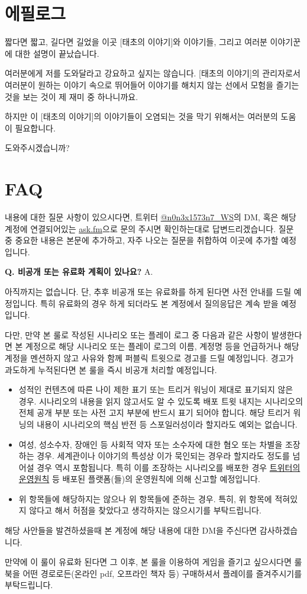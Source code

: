 \documentclass[12pt]{report}
\newcounter{qnactr}
\newenvironment{faq}[1]
{
		\refstepcounter{qnactr}
		\par\medskip
		\textbf{\large Q\theqnactr. #1}
		\newline\rmfamily
		A\theqnactr.
}
{\par\medskip}
\newcommand{\world}[1]{{\nanumpen \large #1 \par}\bigskip}
\begin{document}
	\chapter{에필로그}
	\world{짧다면 짧고, 길다면 길었을 이곳 [태초의 이야기]와 이야기들, 그리고 여러분 이야기꾼에 대한 설명이 끝났습니다.}
	\world{여러분에게 저를 도와달라고 강요하고 싶지는 않습니다. [태초의 이야기]의 관리자로서 여러분이 원하는 이야기 속으로 뛰어들어 이야기를 해치지 않는 선에서 모험을 즐기는 것을 보는 것이 제 재미 중 하나니까요.}
	\world{하지만 이 [태초의 이야기]의 이야기들이 오염되는 것을 막기 위해서는 여러분의 도움이 필요합니다.}
	\world{도와주시겠습니까?}
	
	\chapter{FAQ}
	내용에 대한 질문 사항이 있으시다면, 트위터 \href{https://www.twitter.com/n0n3x1573n7_WS}{@n0n3x1573n7\_WS}의 DM, 혹은 해당 계정에 연결되어있는 \href{https://ask.fm/n0n3x1573n7_WS}{ask.fm}으로 문의 주시면 확인하는대로 답변드리겠습니다. 질문 중 중요한 내용은 본문에 추가하고, 자주 나오는 질문을 취합하여 이곳에 추가할 예정입니다.
	
	\bigskip

	\begin{faq}{비공개 또는 유료화 계획이 있나요?}
		아직까지는 없습니다. 단, 추후 비공개 또는 유료화를 하게 된다면 사전 안내를 드릴 예정입니다. 특히 유료화의 경우 하게 되더라도 본 계정에서 질의응답은 계속 받을 예정입니다.
		
		다만, 만약 본 룰로 작성된 시나리오 또는 플레이 로그 중 다음과 같은 사항이 발생한다면 본 계정으로 해당 시나리오 또는 플레이 로그의 이름, 계정명 등을 언급하거나 해당 계정을 멘션하지 않고 사유와 함께 퍼블릭 트윗으로 경고를 드릴 예정입니다. 경고가 과도하게 누적된다면 본 룰을 즉시 비공개 처리할 예정입니다.
		\begin{itemize}
			\item 성적인 컨텐츠에 따른 나이 제한 표기 또는 트리거 워닝이 제대로 표기되지 않은 경우. 시나리오의 내용을 읽지 않고서도 알 수 있도록 배포 트윗 내지는 시나리오의 전체 공개 부분 또는 사전 고지 부분에 반드시 표기 되어야 합니다. 해당 트리거 워닝의 내용이 시나리오의 핵심 반전 등 스포일러성이라 할지라도 예외는 없습니다.
			\item 여성, 성소수자, 장애인 등 사회적 약자 또는 소수자에 대한 혐오 또는 차별을 조장하는 경우. 세계관이나 이야기의 특성상 이가 묵인되는 경우라 할지라도 정도를 넘어설 경우 역시 포함됩니다. 특히 이를 조장하는 시나리오를 배포한 경우 \href{https://help.twitter.com/ko/rules-and-policies/hateful-conduct-policy}{트위터의 운영원칙} 등 배포된 플랫폼(들)의 운영원칙에 의해 신고할 예정입니다.
			\item 위 항목들에 해당하지는 않으나 위 항목들에 준하는 경우. 특히, 위 항목에 적혀있지 않다고 해서 허점을 찾았다고 생각하지는 않으시기를 부탁드립니다.
		\end{itemize}
		해당 사안들을 발견하셨을때 본 계정에 해당 내용에 대한 DM을 주신다면 감사하겠습니다.
		
		만약에 이 룰이 유료화 된다면 그 이후, 본 룰을 이용하여 게임을 즐기고 싶으시다면 룰북을 어떤 경로로든(온라인 pdf, 오프라인 책자 등) 구매하셔서 플레이를 즐겨주시기를 부탁드립니다.
	\end{faq}
	
\end{document}
